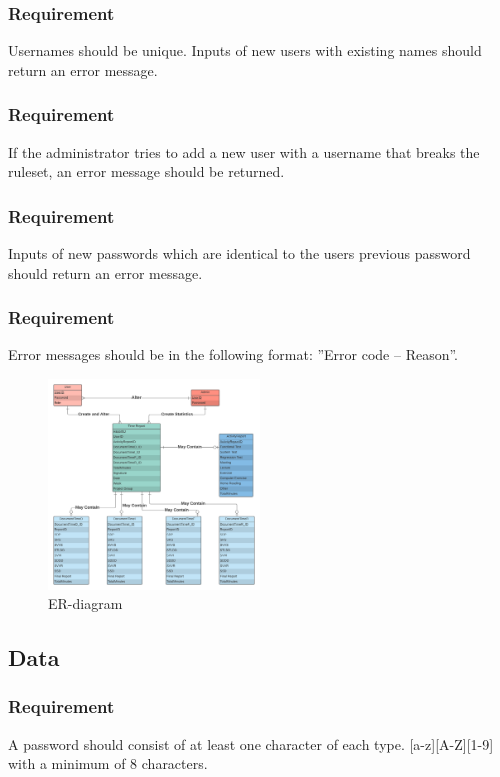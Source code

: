 \documentclass{article}
\begin{document}
\subsubsection{Requirement }
Usernames should be unique. Inputs of new users with existing names should return an error message.
\subsubsection{Requirement}
If the administrator tries to add a new user with a username that breaks the ruleset, an error message should be returned.
\subsubsection{Requirement}
Inputs of new passwords which are identical to the users previous password should return an error message. 
\subsubsection{Requirement}
Error messages should be in the following format: ”Error code – Reason”.


\begin{figure}[placement specifier]
\centering
\includegraphics[width=0.5\textwidth]{PUSPERdiagram.png}
\caption{ER-diagram}
\end{figure}





\subsection{Data}
\subsubsection{Requirement}
A password should consist of at least one character of each type. [a-z][A-Z][1-9] with a minimum of 8 characters.
\end{document}
